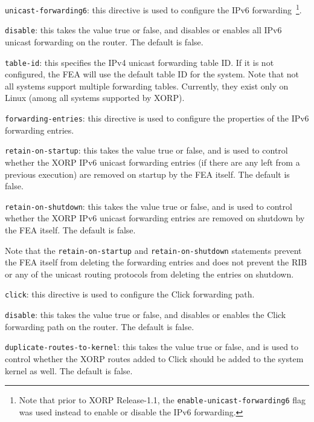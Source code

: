 \begin{description}
\item{\tt unicast-forwarding6}: this directive is used to configure the IPv6
  forwarding~\footnote{Note that prior to XORP Release-1.1, the
  {\tt enable-unicast-forwarding6} flag was used instead to enable or disable
  the IPv6 forwarding.}.
\begin{description}
\item{\tt disable}: this takes the value {\stt true} or {\stt false},
  and disables or enables all IPv6 unicast forwarding on the router.
  The default is {\stt false}.
\item{\tt table-id}: this specifies the IPv4 unicast forwarding table ID.
  If it is not configured, the FEA will use the default table ID for the
  system. Note that not all systems support multiple forwarding tables.
  Currently, they exist only on Linux (among all systems supported by XORP).

\item{\tt forwarding-entries}: this directive is used to configure the
  properties of the IPv6 forwarding entries.
\begin{description}
\item{\tt retain-on-startup}: this takes the value {\stt true} or
  {\stt false}, and is used to control whether the XORP IPv6 unicast
  forwarding entries (if there are any left from a previous execution)
  are removed on startup by the FEA itself. The default is {\stt false}.
\item{\tt retain-on-shutdown}: this takes the value {\stt true} or
  {\stt false}, and is used to control whether the XORP IPv6 unicast
  forwarding entries are removed on shutdown by the FEA itself.
  The default is {\stt false}.
\end{description}
   Note that the {\tt retain-on-startup} and {\tt retain-on-shutdown}
   statements prevent the FEA itself from deleting the forwarding
   entries and does not prevent the RIB or any of the unicast routing
   protocols from deleting the entries on shutdown.
\end{description}

\item{\tt click}: this directive is used to configure the Click
  forwarding path.
\begin{description}
\item{\tt disable}: this takes the value {\stt true} or {\stt false},
  and disables or enables the Click forwarding path on the router. The
  default is {\stt false}.
\item{\tt duplicate-routes-to-kernel}: this takes the value {\stt true}
  or {\stt false}, and is used to control whether the XORP routes added
  to Click should be added to the system kernel as well. The default is
  {\stt false}.


\end{description}
\end{description}
